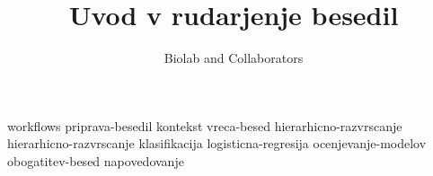 \documentclass[symmetric, justified, a4paper]{tufte-book}
\title{Uvod v rudarjenje besedil}
\author[Biolab and Collaborators]{Biolab and Collaborators}
\begin{document}
\frontmatter

\maketitle



\tableofcontents

% 

\mainmatter



{workflows}
{priprava-besedil}
{kontekst}
{vreca-besed}
{hierarhicno-razvrscanje}
{hierarhicno-razvrscanje}
{klasifikacija}
{logisticna-regresija}
{ocenjevanje-modelov}
{obogatitev-besed}
{napovedovanje}


\backmatter





\printindex
\end{document}
